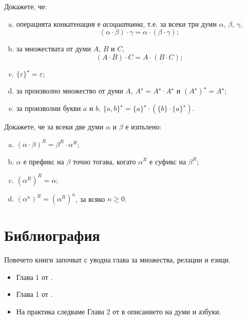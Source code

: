 
\begin{problem}
  Докажете, че:
  \begin{enumerate}[a)]
  \item 
    операцията конкатенация е {\em асоциативна}, т.е. за всеки три думи $\alpha$, $\beta$, $\gamma$,
    \[(\alpha\cdot\beta)\cdot\gamma = \alpha\cdot(\beta\cdot\gamma);\]
  \item
    за множествата от думи $A$, $B$ и $C$,
    \[(A\cdot B)\cdot C = A\cdot (B\cdot C);\]
  \item
    $\{\varepsilon\}^\star = \varepsilon$;
  \item
    за произволно множество от думи $A$,
    $A^\star = A^\star\cdot A^\star$ и $(A^\star)^\star = A^\star$;
  \item
    за произволни букви $a$ и $b$,
    $\{a,b\}^\star = \{a\}^\star\cdot(\{b\}\cdot\{a\}^\star)$.
  \end{enumerate}
\end{problem}

\begin{problem}
  Докажете, че за всеки две думи $\alpha$ и $\beta$ е изпълено:
  \begin{enumerate}[a)]
  \item 
    $(\alpha\cdot\beta)^R = \beta^R\cdot\alpha^R$;
  \item
    $\alpha$ е префикс на $\beta$ точно тогава, когато $\alpha^R$ е суфикс на $\beta^R$;
  \item
    $(\alpha^R)^R = \alpha$;
  \item
    $(\alpha^n)^R = (\alpha^R)^n$, за всяко $n \geq 0$.
  \end{enumerate}
\end{problem}

\section*{Библиография}

Повечето книги започват с уводна глава за множества, релации и езици.
\begin{itemize}
\item 
  Глава 1 от \cite{rosen}.
\item
  Глава 1 от \cite{papadimitriou}.
\item
  На практика следваме Глава 2 от \cite{kozen} в описанието на думи и азбуки.
\end{itemize}

